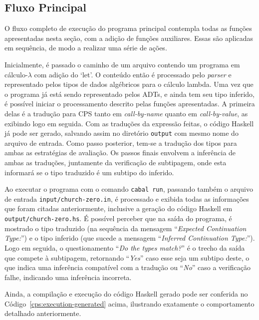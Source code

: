 \subsection{Fluxo Principal}\label{subsec:cps-main-program}
O fluxo completo de execução do programa principal contempla todas as funções apresentadas nesta seção, com a adição de funções auxiliares.
Essas são aplicadas em sequência, de modo a realizar uma série de ações.

Inicialmente, é passado o caminho de um arquivo contendo um programa em cálculo-$\lambda$ com adição do `let'.
O conteúdo então é processado pelo \textit{parser} e representado pelos tipos de dados algébricos para o cálculo lambda.
Uma vez que o programa já está sendo representado pelos ADTs, e ainda tem seu tipo inferido, é possível iniciar o processamento descrito pelas funções apresentadas.
A primeira delas é a tradução para CPS tanto em \textit{call-by-name} quanto em \textit{call-by-value}, as exibindo logo em seguida.
Com as traduções da expressão feitas, o código Haskell já pode ser gerado, salvando assim no diretório \texttt{output} com mesmo nome do arquivo de entrada.
Como passo posterior, tem-se a tradução dos tipos para ambas as estratégias de avaliação.
Os passos finais envolvem a inferência de ambas as traduções, juntamente da verificação de subtipagem, onde esta informará se o tipo traduzido é um subtipo do inferido.

\lstset{extendedchars=false, escapeinside=''}

Ao executar o programa com o comando \texttt{cabal run}, passando também o arquivo de entrada \texttt{input/church-zero.in}, é processado e exibida todas as informações que foram citadas anteriormente, inclusive a geração do código Haskell em \texttt{output/church-zero.hs}.
É possível perceber que na saída do programa, é mostrado o tipo traduzido (na sequência da mensagem ``\textit{Expected Continuation Type:}'') e o tipo inferido (que sucede a mensagem ``\textit{Inferred Continuation Type:}'').
Logo em seguida, o questionamento ``\textit{Do the types match?}'' é o trecho da saída que compete à subtipagem, retornando ``\textit{Yes}'' caso esse seja um subtipo deste, o que indica uma inferência compatível com a tradução ou ``\textit{No}'' caso a verificação falhe, indicando uma inferência incorreta.

\lstset{extendedchars=false, escapeinside=''}

Ainda, a compilação e execução do código Haskell gerado pode ser conferida no Código~\ref{cps:execution-generated} acima, ilustrando exatamente o comportamento detalhado anteriormente.
